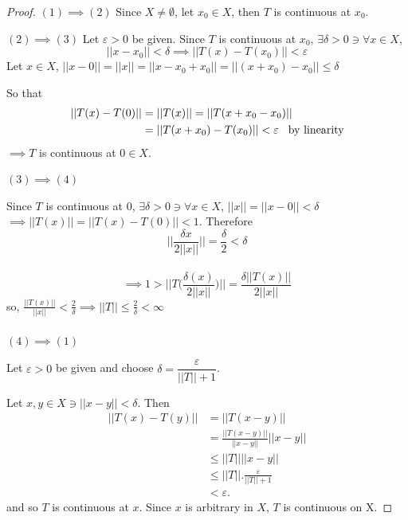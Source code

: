 \documentclass[11pt,a4paper]{article}
\theoremstyle{definition}
\begin{document}
\begin{proof}
$(1)\implies (2)$\hspace{0.3cm}
Since $X\neq \emptyset$, let $x_0\in X$, then $T$ is continuous at $x_0$.


$(2)\implies (3)$\hspace{0.3cm}
Let $\varepsilon >0$ be given. Since $T$ is continuous at $x_0$, $\exists \delta >0\ni \forall x\in X$, $$||x-x_0||<\delta \implies ||T(x)-T(x_0)||<\varepsilon$$ Let $x\in X$,\hspace{0.3cm}
$||x-0|| =||x||=||x-x_0+x_0||=||(x+x_0)-x_0||\leq \delta$

So that 
\begin{align*}
||T(x)-T(0)|| &=||T(x)||
               =||T(x+x_0-x_0)||\\
              &=||T(x+x_0)-T(x_0)||<\varepsilon \hspace{0.3cm} \text{by linearity}
\end{align*}
$\implies T$ is continuous at $0\in X$.


$(3)\implies (4)$

Since $T$ is continuous at $0$, $\exists \delta >0\ni \forall x\in X$, $||x||=||x-0||<\delta$ \\$\implies ||T(x)||=||T(x)-T(0)||<1$.
Therefore $$\Bigg|\Bigg|\frac{\delta x}{2||x||}\Bigg|\Bigg|=\frac{\delta}{2}<\delta$$\\ $$\implies 1>\Bigg|\Bigg|T\Bigg(\frac{\delta (x)}{2||x||}\Bigg)\Bigg|\Bigg|=\frac{\delta ||T(x)||}{2||x||}$$ so, \hspace{0.3cm}$\displaystyle{\frac{||T(x)||}{||x||}<\frac{2}{\delta}\implies ||T||\leq \frac{2}{\delta}<\infty}$\\\\

$(4)\implies (1)$

Let $\varepsilon >0$ be given and choose $\delta =\dfrac{\varepsilon}{||T||+1}$.

Let $x,y\in X\ni ||x-y||<\delta$. Then
\begin{align*}
||T(x)-T(y)|| &=||T(x-y)||\\
              &=\frac{||T(x-y)||}{||x-y||}||x-y||\\
              &\leq ||T||||x-y||\\
              &\leq ||T||.\frac{\varepsilon}{||T||+1}\\
              &<\varepsilon.
\end{align*} 
and so $T$ is continuous at $x$. Since $x$ is arbitrary in $X$, $T$ is continuous on X.

\end{proof}
\end{document}
